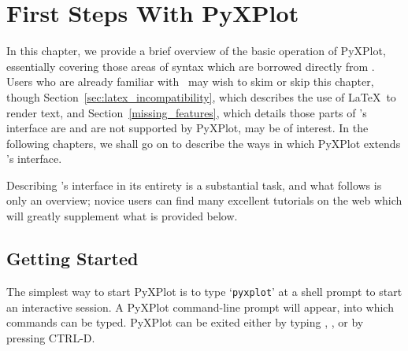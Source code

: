 %
%
%
%
%



\chapter{First Steps With PyXPlot}
\label{gnuplot_intro}

In this chapter, we provide a brief overview of the basic operation of PyXPlot,
essentially covering those areas of syntax which are borrowed directly from
\gnuplot. Users who are already familiar with \gnuplot\ may wish to skim or
skip this chapter, though Section~\ref{sec:latex_incompatibility}, which
describes the use of \LaTeX\ to render text, and
Section~\ref{missing_features}, which details those parts of \gnuplot's
interface are and are not supported by PyXPlot, may be of interest. In the
following chapters, we shall go on to describe the ways in which PyXPlot
extends \gnuplot's interface.

Describing \gnuplot's interface in its entirety is a substantial task, and what
follows is only an overview; novice users can find many excellent tutorials on
the web which will greatly supplement what is provided below.

\section{Getting Started}

The simplest way to start PyXPlot is to type `{\tt pyxplot}' at a shell prompt
to start an interactive session. A PyXPlot command-line prompt will appear,
into which commands can be typed. PyXPlot can be exited either by typing
, , or by pressing CTRL-D.

